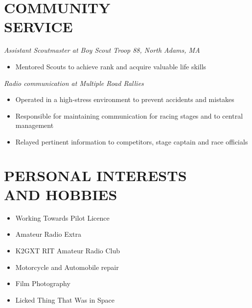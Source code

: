 \documentclass[line,margin]{res}
\begin{document}
\begin{resume}
\section{COMMUNITY \\ SERVICE}  
{\sl	Assistant Scoutmaster at Boy Scout Troop 88, North Adams, MA}
	\begin{itemize}  \itemsep -2pt %
		\item Mentored Scouts to achieve rank and acquire valuable life skills%
	\end{itemize}
	\vspace{-5pt}
	{\sl	Radio communication at Multiple Road Rallies}
	\begin{itemize}  \itemsep -2pt %
		\item Operated in a high-stress environment to prevent accidents and mistakes		
		\item Responsible for maintaining communication for racing stages and to central management
		\item Relayed pertinent information to competitors, stage captain and race officials
	\end{itemize}

\section{PERSONAL INTERESTS \\ AND HOBBIES}             
				\begin{multicols}{2}
					\begin{itemize}
						\itemsep -2pt
	\item[]Working Towards Pilot Licence
	\item[]Amateur Radio Extra
	\item[]K2GXT RIT Amateur Radio Club
	\item[]Motorcycle and Automobile repair
	\item[]Film Photography
	\item[]Licked Thing That Was in Space

	\end{itemize}
	\end{multicols}


\end{resume}
\end{document}
